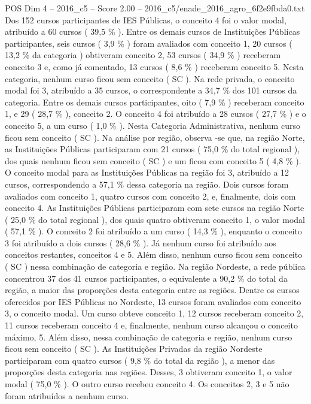 \begin{textsample}{POS Dim 4 – 2016\_c5 – Score 2.00 – 2016\_c5/enade\_2016\_agro\_6f2e9fbda0.txt}
Dos 152 cursos participantes de IES Públicas, o conceito 4 foi o valor modal, atribuído a 60 cursos ( 39,5 \% ).
Entre os demais cursos de Instituições Públicas participantes, seis cursos ( 3,9 \% ) foram avaliados com conceito 1, 20 cursos ( 13,2 \% da categoria ) obtiveram conceito 2, 53 cursos ( 34,9 \% ) receberam conceito 3 e, como já comentado, 13 cursos ( 8,6 \% ) receberam conceito 5.
Nesta categoria, nenhum curso ficou sem conceito ( SC ).
Na rede privada, o conceito modal foi 3, atribuído a 35 cursos, o correspondente a 34,7 \% dos 101 cursos da categoria.
Entre os demais cursos participantes, oito ( 7,9 \% ) receberam conceito 1, e 29 ( 28,7 \% ), conceito 2.
O conceito 4 foi atribuído a 28 cursos ( 27,7 \% ) e o conceito 5, a um curso ( 1,0 \% ).
Nesta Categoria Administrativa, nenhum curso ficou sem conceito ( SC ).
Na análise por região, observa -se que, na região Norte, as Instituições Públicas participaram com 21 cursos ( 75,0 \% do total regional ), dos quais nenhum ficou sem conceito ( SC ) e um ficou com conceito 5 ( 4,8 \% ).
O conceito modal para as Instituições Públicas na região foi 3, atribuído a 12 cursos, correspondendo a 57,1 \% dessa categoria na região.
Dois cursos foram avaliados com conceito 1, quatro cursos com conceito 2, e, finalmente, dois com conceito 4.
As Instituições Públicas participaram com sete cursos na região Norte ( 25,0 \% do total regional ), dos quais quatro obtiveram conceito 1, o valor modal ( 57,1 \% ).
O conceito 2 foi atribuído a um curso ( 14,3 \% ), enquanto o conceito 3 foi atribuído a dois cursos ( 28,6 \% ).
Já nenhum curso foi atribuído aos conceitos restantes, conceitos 4 e 5.
Além disso, nenhum curso ficou sem conceito ( SC ) nessa combinação de categoria e região.
Na região Nordeste, a rede pública concentrou 37 dos 41 cursos participantes, o equivalente a 90,2 \% do total da região, a maior das proporções desta categoria entre as regiões.
Dentre os cursos oferecidos por IES Públicas no Nordeste, 13 cursos foram avaliados com conceito 3, o conceito modal.
Um curso obteve conceito 1, 12 cursos receberam conceito 2, 11 cursos receberam conceito 4 e, finalmente, nenhum curso alcançou o conceito máximo, 5.
Além disso, nessa combinação de categoria e região, nenhum curso ficou sem conceito ( SC ).
As Instituições Privadas da região Nordeste participaram com quatro cursos ( 9,8 \% do total da região ), a menor das proporções desta categoria nas regiões.
Desses, 3 obtiveram conceito 1, o valor modal ( 75,0 \% ).
O outro curso recebeu conceito 4.
Os conceitos 2, 3 e 5 não foram atribuídos a nenhum curso.

\end{textsample}
